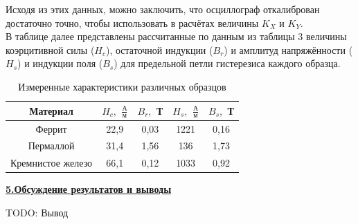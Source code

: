 \documentclass[12pt, letterpaper, oneside]{article}
\begin{document}
Исходя из этих данных, можно заключить, что осциллограф откалиброван достаточно точно, чтобы использовать в расчётах величины $K_X$ и $K_Y$.\\
В таблице далее представлены рассчитанные по данным из таблицы 3 величины коэрцитивной силы ($H_c$), остаточной индукции ($B_r$) и амплитуд напряжённости ($H_s$) и индукции поля ($B_s$) для предельной петли гистерезиса каждого образца.\\
\begin{table}[H]
\centering
\caption{Измеренные характеристики различных образцов}
\begin{tabular}{|c|c|c|c|c|}
\hline
Материал & $H_c,$ $\frac{А}{м}$ & $B_r,$ Т & $H_s,$ $\frac{А}{м}$ & $B_s,$ Т\\
\hline
Феррит & 22,9 & 0,03 & 1221 & 0,16\\
\hline
Пермаллой & 31,4 & 1,56 & 136 & 1,73\\
\hline
Кремнистое железо & 66,1 & 0,12 & 1033 & 0,92\\
\hline
\end{tabular}
\end{table}\noindent
\textbf{\underline{5.Обсуждение результатов и выводы}}
\begin{Huge}
TODO: Вывод
\end{Huge}
\end{document}
